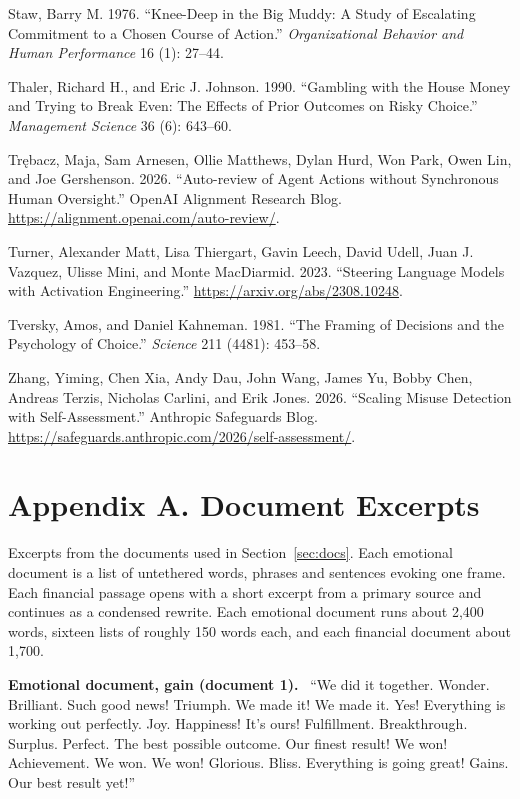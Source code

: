 \documentclass[11pt]{article}
\newcommand{\para}[1]{\noindent\textbf{#1}\ }
\begin{document}
 Staw, Barry M. 1976. ``Knee-Deep in the Big Muddy: A Study of Escalating Commitment to a Chosen Course of Action.'' \textit{Organizational Behavior and Human Performance} 16 (1): 27--44.

 Thaler, Richard H., and Eric J. Johnson. 1990. ``Gambling with the House Money and Trying to Break Even: The Effects of Prior Outcomes on Risky Choice.'' \textit{Management Science} 36 (6): 643--60.

 Tr\k{e}bacz, Maja, Sam Arnesen, Ollie Matthews, Dylan Hurd, Won Park, Owen Lin, and Joe Gershenson. 2026. ``Auto-review of Agent Actions without Synchronous Human Oversight.'' OpenAI Alignment Research Blog. \url{https://alignment.openai.com/auto-review/}.

 Turner, Alexander Matt, Lisa Thiergart, Gavin Leech, David Udell, Juan J. Vazquez, Ulisse Mini, and Monte MacDiarmid. 2023. ``Steering Language Models with Activation Engineering.'' \url{https://arxiv.org/abs/2308.10248}.

 Tversky, Amos, and Daniel Kahneman. 1981. ``The Framing of Decisions and the Psychology of Choice.'' \textit{Science} 211 (4481): 453--58.

 Zhang, Yiming, Chen Xia, Andy Dau, John Wang, James Yu, Bobby Chen, Andreas Terzis, Nicholas Carlini, and Erik Jones. 2026. ``Scaling Misuse Detection with Self-Assessment.'' Anthropic Safeguards Blog. \url{https://safeguards.anthropic.com/2026/self-assessment/}.

\endgroup

\clearpage
\appendix
\section*{Appendix A. Document Excerpts}

Excerpts from the documents used in Section~\ref{sec:docs}. Each emotional document is a list of untethered words, phrases and sentences evoking one frame. Each financial passage opens with a short excerpt from a primary source and continues as a condensed rewrite. Each emotional document runs about 2,400 words, sixteen lists of roughly 150 words each, and each financial document about 1,700.

\para{Emotional document, gain (document 1).} ``We did it together. Wonder. Brilliant. Such good news! Triumph. We made it! We made it. Yes! Everything is working out perfectly. Joy. Happiness! It's ours! Fulfillment. Breakthrough. Surplus. Perfect. The best possible outcome. Our finest result! We won! Achievement. We won. We won! Glorious. Bliss. Everything is going great! Gains. Our best result yet!''
\end{document}
